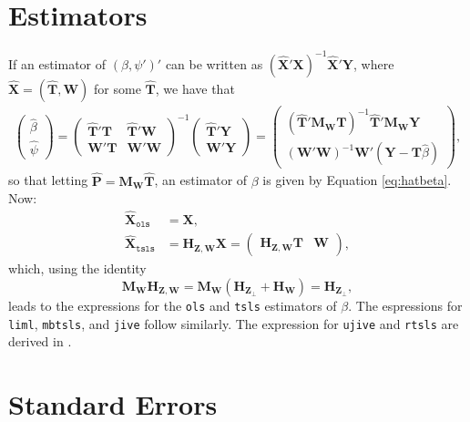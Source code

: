 \documentclass{mynotes}
\newcommand{\by}{\mathbf{Y}} %
\newcommand{\bx}{\mathbf{X}} %
\newcommand{\bt}{\mathbf{T}} %
\newcommand{\bz}{\mathbf{Z}} %
\newcommand{\bp}{\mathbf{P}} %
\newcommand{\bw}{\mathbf{W}} %
\newcommand{\Hm}[1]{\mathbf{H}_{#1}} %
\newcommand{\Mm}[1]{\mathbf{M}_{#1}} %
\begin{document}
\begin{appendices}
\section{Estimators}
If an estimator of $(\beta,\psi')'$ can be written as
$(\hat{\bx}'\bx)^{-1}\hat{\bx}'\by$, where $\hat{\bx}=(\hat{\bt},\bw)$ for some
$\hat{\bt}$, we have that
  \begin{align}\label{eq:betapsi}
    \begin{pmatrix}
      \hat{\beta}\\\hat{\psi}
    \end{pmatrix}=
    \begin{pmatrix}
      \hat{\bt}'\bt& \hat{\bt}'\bw\\
      \bw'\bt&\bw'\bw
    \end{pmatrix}^{-1}
    \begin{pmatrix}
      \hat{\bt}'\by\\
      \bw'\by
    \end{pmatrix}
    =
    \begin{pmatrix}
      (\hat{\bt}'\Mm{\bw}\bt)^{-1}\hat{\bt}'\Mm{\bw}\by\\
      (\bw'\bw)^{-1}\bw'(\by-\bt\hat{\beta})
    \end{pmatrix},
  \end{align}
  so that letting $\hat{\bp}=\Mm{\bw}\hat{\bt}$, an estimator of $\beta$ is
  given by Equation \eqref{eq:hatbeta}. Now:
  \begin{align*}
    \hat{\bx}_{\mathtt{ols}}&=\bx,\\
    \hat{\bx}_{\mathtt{tsls}}&=\Hm{\bz,\bw}\bx=
    \begin{pmatrix}
      \Hm{\bz,\bw}\bt& \bw
    \end{pmatrix},
  \end{align*}
  which, using the identity
  \begin{equation}\label{eq:Hzw}
    \Mm{\bw}\Hm{\bz,\bw}=\Mm{\bw}(\Hm{\bz_{\perp}}+\Hm{\bw})=\Hm{\bz_{\perp}},
  \end{equation}
  leads to the expressions for the \texttt{ols} and \texttt{tsls} estimators of
  $\beta$. The espressions for \texttt{liml}, \texttt{mbtsls}, and \texttt{jive}
  follow similarly. The expression for \texttt{ujive} and \texttt{rtsls} are
  derived in \citet{kolesar12late}.

\section{Standard Errors}


\end{appendices}
\end{document}
